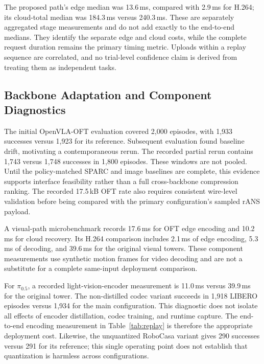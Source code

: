 The proposed path's edge median was 13.6\,ms, compared with 2.9\,ms for
H.264; its cloud-total median was 184.3\,ms versus 240.3\,ms. These are
separately aggregated stage measurements and do not add exactly to the
end-to-end medians. They identify the separate edge and cloud costs, while
the complete request duration remains the primary timing metric.
Uploads within a replay sequence are correlated, and no trial-level
confidence claim is derived from treating them as independent tasks.

\subsection{Backbone Adaptation and Component Diagnostics}
The initial OpenVLA-OFT evaluation covered 2,000 episodes, with
1,933 successes versus 1,923 for its reference. Subsequent evaluation
found baseline drift, motivating a contemporaneous rerun. The recorded
partial rerun contains 1,743 versus 1,748 successes in 1,800 episodes.
These windows are not pooled. Until the policy-matched SPARC and image
baselines are complete, this evidence supports interface feasibility
rather than a full cross-backbone compression ranking. The recorded
17.5\,kB OFT rate also requires consistent wire-level validation before
being compared with the primary configuration's sampled rANS payload.

A visual-path microbenchmark records 17.6\,ms for OFT edge encoding
and 10.2\,ms for cloud recovery. Its H.264 comparison includes 2.1\,ms
of edge encoding, 5.3\,ms of decoding, and 39.6\,ms for the original
visual towers. These component measurements use synthetic motion
frames for video decoding and are not a substitute for a complete
same-input deployment comparison.

For $\pi_{0.5}$, a recorded light-vision-encoder measurement is 11.0\,ms
versus 39.9\,ms for the original tower. The non-distilled codec variant
succeeds in 1,918 LIBERO episodes versus 1,934 for the main configuration.
This diagnostic does not isolate all effects of encoder distillation, codec
training, and runtime capture. The end-to-end encoding measurement in
Table~\ref{tab:replay} is therefore the appropriate deployment cost.
Likewise, the unquantized RoboCasa variant gives 290 successes versus
291 for its reference; this single operating point does not establish
that quantization is harmless across configurations.

